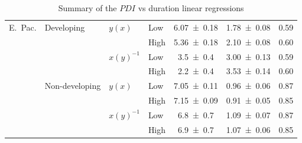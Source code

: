 \begin{table}[H]
\begin{tabular}{l l l l c c c }
		\toprule
		\multirow{8}{*}{E.~Pac.}
		& \multirow{4}{*}{Developing}
		& \multirow{2}{*}{$y(x)$}
		  & Low  & \num{6.07 \pm 0.18} & \num{1.78 \pm 0.08} & \num{0.59} \\
		& & & High & \num{5.36 \pm 0.18} & \num{2.10 \pm 0.08} & \num{0.60} \\
		\cmidrule(l){3-7}
		& & \multirow{2}{*}{$x(y)^{-1}$}
		  & Low  & \num{3.5 \pm 0.4} & \num{3.00 \pm 0.13} & \num{0.59} \\
		& & & High & \num{2.2 \pm 0.4} & \num{3.53 \pm 0.14} & \num{0.60} \\
		\cmidrule(l){2-7} %
		& \multirow{4}{*}{Non-developing}
		& \multirow{2}{*}{$y(x)$}
		  & Low  & \num{7.05 \pm 0.11} & \num{0.96 \pm 0.06} & \num{0.87} \\
		& & & High & \num{7.15 \pm 0.09} & \num{0.91 \pm 0.05} & \num{0.85} \\
		\cmidrule(l){3-7}
		& & \multirow{2}{*}{$x(y)^{-1}$}
		  & Low  & \num{6.8 \pm 0.7} & \num{1.09 \pm 0.07} & \num{0.87} \\
		& & & High & \num{6.9 \pm 0.7} & \num{1.07 \pm 0.06} & \num{0.85} \\
		\bottomrule
	\end{tabular}
	\caption{Summary of the $PDI$ vs duration linear regressions}
	\label{tab:pdi-corrs}
\end{table}

